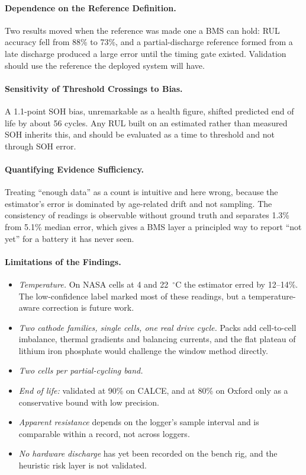 \documentclass[12pt,a4paper]{amritareport}
\begin{document}
\paragraph{Dependence on the Reference Definition.} Two results moved when the reference was made one a BMS can hold: RUL accuracy fell from 88\% to 73\%, and a partial-discharge reference formed from a late discharge produced a large error until the timing gate existed. Validation should use the reference the deployed system will have.

\paragraph{Sensitivity of Threshold Crossings to Bias.} A 1.1-point SOH bias, unremarkable as a health figure, shifted predicted end of life by about 56 cycles. Any RUL built on an estimated rather than measured SOH inherits this, and should be evaluated as a time to threshold and not through SOH error.

\paragraph{Quantifying Evidence Sufficiency.} Treating ``enough data'' as a count is intuitive and here wrong, because the estimator's error is dominated by age-related drift and not sampling. The consistency of readings is observable without ground truth and separates 1.3\% from 5.1\% median error, which gives a BMS layer a principled way to report ``not yet'' for a battery it has never seen.

\paragraph{Limitations of the Findings.}
\begin{itemize}
    \item \emph{Temperature.} On NASA cells at 4 and 22~$^\circ$C the estimator erred by 12--14\%. The low-confidence label marked most of these readings, but a temperature-aware correction is future work.
    \item \emph{Two cathode families, single cells, one real drive cycle.} Packs add cell-to-cell imbalance, thermal gradients and balancing currents, and the flat plateau of lithium iron phosphate would challenge the window method directly.
    \item \emph{Two cells per partial-cycling band.}
    \item \emph{End of life:} validated at 90\% on CALCE, and at 80\% on Oxford only as a conservative bound with low precision.
    \item \emph{Apparent resistance} depends on the logger's sample interval and is comparable within a record, not across loggers.
    \item \emph{No hardware discharge} has yet been recorded on the bench rig, and the heuristic risk layer is not validated.
\end{itemize}
\end{document}
